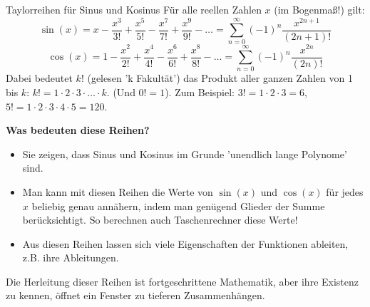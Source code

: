 \begin{infoboxumgebung}{Taylorreihen für Sinus und Kosinus}
Für alle reellen Zahlen $x$ (im Bogenmaß!) gilt:
\[ \sin(x) = x - \frac{x^3}{3!} + \frac{x^5}{5!} - \frac{x^7}{7!} + \frac{x^9}{9!} - \dots = \sum_{n=0}^{\infty} (-1)^n \frac{x^{2n+1}}{(2n+1)!} \]
\[ \cos(x) = 1 - \frac{x^2}{2!} + \frac{x^4}{4!} - \frac{x^6}{6!} + \frac{x^8}{8!} - \dots = \sum_{n=0}^{\infty} (-1)^n \frac{x^{2n}}{(2n)!} \]
Dabei bedeutet $k!$ (gelesen 'k Fakultät') das Produkt aller ganzen Zahlen von 1 bis $k$: $k! = 1 \cdot 2 \cdot 3 \cdot \dots \cdot k$. (Und $0!=1$).
Zum Beispiel: $3! = 1 \cdot 2 \cdot 3 = 6$, $5! = 1 \cdot 2 \cdot 3 \cdot 4 \cdot 5 = 120$.

\textbf{Was bedeuten diese Reihen?}
\begin{itemize}
    \item Sie zeigen, dass Sinus und Kosinus im Grunde 'unendlich lange Polynome' sind.
    \item Man kann mit diesen Reihen die Werte von $\sin(x)$ und $\cos(x)$ für jedes $x$ beliebig genau annähern, indem man genügend Glieder der Summe berücksichtigt. So berechnen auch Taschenrechner diese Werte!
    \item Aus diesen Reihen lassen sich viele Eigenschaften der Funktionen ableiten, z.B. ihre Ableitungen.
\end{itemize}
Die Herleitung dieser Reihen ist fortgeschrittene Mathematik, aber ihre Existenz zu kennen, öffnet ein Fenster zu tieferen Zusammenhängen.
\end{infoboxumgebung}

